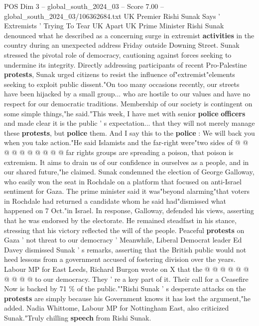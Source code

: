 \begin{textsample}{POS Dim 3 – global\_south\_2024\_03 – Score 7.00 – global\_south\_2024\_03/106362684.txt}  \label{ex:f3_pos_423}
UK Premier Rishi Sunak Says ' Extremists ' Trying To Tear UK Apart UK Prime Minister Rishi Sunak denounced what he described as a concerning surge in extremist \textbf{activities} in the country during an unexpected address Friday outside Downing Street.
Sunak stressed the pivotal role of democracy, cautioning against forces seeking to undermine its integrity.
Directly addressing participants of recent Pro-Palestine \textbf{protests}, Sunak urged citizens to resist the influence of"extremist"elements seeking to exploit public dissent."On too many occasions recently, our streets have been hijacked by a small group... who are hostile to our values and have no respect for our democratic traditions.
Membership of our society is contingent on some simple things,"he said."This week, I have met with senior \textbf{police} \textbf{officers} and made clear it is the public ' s expectation... that they will not merely manage these \textbf{protests}, but \textbf{police} them.
And I say this to the \textbf{police} : We will back you when you take action."He said Islamists and the far-right were"two sides of @ @ @ @ @ @ @ @ @ @ far rights groups are spreading a poison, that poison is extremism.
It aims to drain us of our confidence in ourselves as a people, and in our shared future,"he claimed.
Sunak condemned the election of George Galloway, who easily won the seat in Rochdale on a platform that focused on anti-Israel sentiment for Gaza.
The prime minister said it was"beyond alarming"that voters in Rochdale had returned a candidate whom he said had"dismissed what happened on 7 Oct."in Israel.
In response, Galloway, defended his views, asserting that he was endorsed by the electorate.
He remained steadfast in his stance, stressing that his victory reflected the will of the people.
Peaceful \textbf{protests} on Gaza ' not threat to our democracy ' Meanwhile, Liberal Democrat leader Ed Davey dismissed Sunak ' s remarks, asserting that the British public would not heed lessons from a government accused of fostering division over the years.
Labour MP for East Leeds, Richard Burgon wrote on X that the @ @ @ @ @ @ @ @ @ @ to our democracy.
They ' re a key part of it.
Their call for a Ceasefire Now is backed by 71 \% of the public.""Rishi Sunak ' s desperate attacks on the \textbf{protests} are simply because his Government knows it has lost the argument,"he added.
Nadia Whittome, Labour MP for Nottingham East, also criticized Sunak."Truly chilling \textbf{speech} from Rishi Sunak.

\end{textsample}
